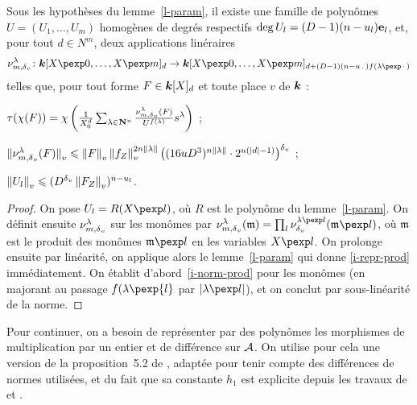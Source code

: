 \begin{lem} \label{l-par-prod}
  Sous les hypothèses du lemme~\ref{l-param}, il existe une famille de polynômes
  $U = (U_1, \ldots, U_m)$ homogènes de degrés respectifs $\deg U_l =
  (D-1)(n-u_l){\mathbf e}_l$, et, pour tout $d \in N^m$, deux applications linéraires
  \[
    \nu_{m, \dv}^\lambda \colon \cdn[X\pexp 0, \ldots, X\pexp m]_d \to
    \cdn[X\pexp 0, \ldots, X\pexp m]_{d + (D-1)(n-u_\truc)f(\lambda\pexp\truc)}
  \]
  telles que, pour tout forme $F\in \boldsymbol{k}[X]_d$ et toute place $v$ de $\boldsymbol{k}$ :
  \begin{enumthm}
    \item \label{i-repr-prod} $\tau(\chi(F)) =
      \chi\left( \frac1{X_0^d} \sum_{\lambda \in \cramped{\N^u}}
      \frac {\nu_{m, \dv}^\lambda(F)} {U^{f(\lambda)}} s^\lambda \right)$ ;
    \item \label{i-norm-prod} $\left\lVert\smash{\nu_{m, {\delta\smash{_v}}}^\lambda(F)}\right\rVert_{v} \leqslant \left\lVert F\right\rVert_{v}
      \left\lVert f_Z\right\rVert_{v}^{2n\lVert\lambda\rVert} \bigl(
      (16uD^3)^{n\lVert\lambda\rVert} \cdot 2^{u({\lvert d\rvert} -1)} \bigr)^{\delta\smash{_v}}$ ;
    \item $\left\lVert U_l\right\rVert_{v} \leqslant (D^{\delta\smash{_v}} \left\lVert F_Z\right\rVert_{v})^{n-u_l}$.
  \end{enumthm}
\end{lem}

\begin{proof}
  On pose $U_l = R(X\pexp l)$, où $R$ est le polynôme du lemme~\ref{l-param}.
  On définit ensuite $\nu_{m, {\delta\smash{_v}}}^\lambda$ sur les monômes par $\nu_{m,
  \dv}^\lambda(\mathfrak m) = \prod_l \nu_\dv^{\lambda\pexp l}(\mathfrak m\pexp
  l)$, où $\mathfrak m$ est le produit des monômes $\mathfrak m\pexp l$ en les
  variables $X\pexp l$. On prolonge ensuite par linéarité, on applique alors le
  lemme~\ref{l-param} qui donne \ref{i-repr-prod} immédiatement. On établit
  d'abord~\ref{i-norm-prod} pour les monômes (en majorant au passage
  $f(\lambda\pexp{l}$ par $\lgr{\lambda\pexp l}$), et on conclut par
  sous-linéarité de la norme.
\end{proof}

Pour continuer, on a besoin de représenter par des polynômes les morphismes de
multiplication par un entier et de différence sur $\mathcal A$. On utilise pour cela une
version de la proposition~5.2 de , adaptée pour tenir compte des
différences de normes utilisées, et du fait que sa constante $h_1$ est explicite
depuis les travaux de  et .

